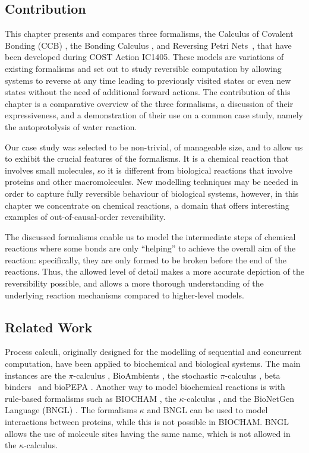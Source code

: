 \documentclass[runningheads]{llncs}
\begin{document}
\subsection{Contribution}  This chapter presents and compares three formalisms, the Calculus of Covalent 
Bonding (CCB) \cite{KU16,KUHN201818}, the Bonding Calculus \cite{NaCo18}, and Reversing Petri Nets~\cite{RPNs}, that have been developed during COST Action IC1405. These models are variations of existing formalisms and set out to study reversible computation by allowing systems to reverse at any time leading to previously visited states or even new states without the need of additional forward actions. The contribution of this chapter is a comparative overview of the three formalisms, a discussion of their expressiveness, and a demonstration of their use on a common case study, namely the autoprotolysis of water
reaction.

Our case study was selected to be non-trivial, of manageable size, and to allow us to 
exhibit the crucial features of the formalisms. It is a chemical reaction that involves small molecules,
so it is different from biological reactions that involve proteins and other macromolecules. 
New modelling techniques may be needed in order to capture fully reversible behaviour of biological systems, however,
in this chapter we concentrate on chemical  reactions, a domain that offers
interesting examples of out-of-causal-order reversibility. 

The discussed formalisms enable us to model the intermediate steps of chemical reactions where 
some bonds are only ``helping'' to achieve the overall aim of the reaction:  specifically, they 
are only formed to be
broken before the end of the reactions.  Thus, the allowed level of detail 
makes a more accurate depiction of the reversibility possible, and allows a more thorough understanding of the underlying reaction mechanisms 
compared to higher-level models.


\subsection{Related Work} 
Process calculi, originally designed for the modelling of sequential and 
concurrent computation, have been applied to biochemical and biological systems. The main 
instances  are the $\pi$-calculus \cite{Regev2004}, BioAmbients \cite{RegevBioambients}, the stochastic $\pi$-calculus \cite{PriamiStochasticPi}, beta binders~\cite{betabinders} and bioPEPA \cite{CiocchettaBiopepa}. Another way to model biochemical reactions is with rule-based formalisms such as BIOCHAM \cite{biocham}, the $\kappa$-calculus  \cite{danoscausality}, and the BioNetGen Language (BNGL) \cite{pmid19399430}. 
The formalisms $\kappa$ and BNGL can be used to model interactions between proteins, while this is not
possible in BIOCHAM. BNGL allows the use of molecule sites having the same name, which is not allowed 
in the $\kappa$-calculus.
\end{document}
